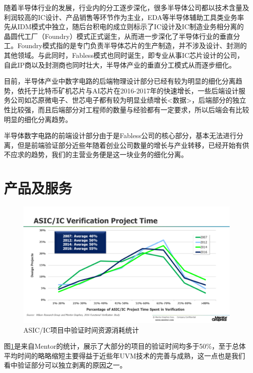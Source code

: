 \documentclass[a4paper,11pt]{article}
\begin{document}
随着半导体行业的发展，行业内的分工逐步深化，很多半导体公司都以技术含量及利润较高的IC设计、产品销售等环节作为主业，EDA等半导体辅助工具类业务率先从IDM模式中独立，随后台积电的成立则标示了IC设计及IC制造业务相分离的晶圆代工厂（Foundry）模式正式诞生，从而进一步深化了半导体行业的垂直分工。Foundry模式指的是专门负责半导体芯片的生产制造，并不涉及设计、封测的其他领域。与此同时，Fabless模式也同时诞生，即专业从事IC芯片设计的公司，自此IP商以及封测商也同时壮大，半导体产业的垂直分工模式从而逐步细化。

目前，半导体产业中数字电路的后端物理设计部分已经有较为明显的细化分离趋势，依托于比特币矿机芯片与AI芯片在2016-2017年的快速增长，一些后端设计服务公司如芯原微电子、世芯电子都有较为明显业绩增长<数据>，后端部分的独立性比较强，而且后端部分对工程师的数量与经验都有一定要求，所以后端会有比较明显的细化分离趋势。

半导体数字电路的前端设计部分由于是Fabless公司的核心部分，基本无法进行分离，但是前端验证部分近些年随着创业公司数量的增长与产业转移，已经开始有供不应求的趋势，我们的主营业务便是这一块业务的细化分离。
\pagebreak

\section{产品及服务}
\begin{figure}[ht]
  \centering
  \includegraphics[width=0.8\linewidth]{images/wilson1.png}
  \caption{ASIC/IC项目中验证时间资源消耗统计}
  \label{fig:wilson_1}
\end{figure}

图\ref{fig:wilson_1}是来自Mentor的统计，展示了大部分的项目的验证时间均多于50\%，至于总体平均时间的略略缩短主要得益于近些年UVM技术的完善与成熟，这一点也是我们看中验证部分可以独立剥离的原因之一。
\end{document}
